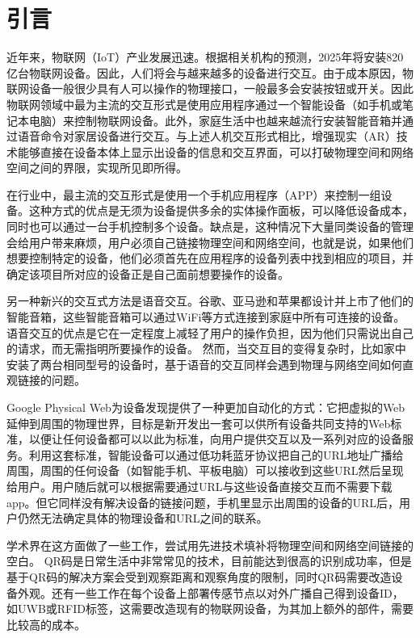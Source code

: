 \def\fr{30}
\def\edg{边缘服务端}
\def\fr{10}
\def\acc{72.7\%}
\def\idenT{93毫秒}
\def\uiT{20秒}

\chapter{引言}
\label{chap:introduction}
近年来，物联网（IoT）产业发展迅速。根据相关机构的预测\cite{macgillivray2019worldwide}，2025年将安装820亿台物联网设备。因此，人们将会与越来越多的设备进行交互。由于成本原因，物联网设备一般很少具有人可以操作的物理接口，一般最多会安装按钮或开关。因此物联网领域中最为主流的交互形式是使用应用程序通过一个智能设备（如手机或笔记本电脑）来控制物联网设备\cite{homeass,xiaomi}。此外，家庭生活中也越来越流行安装智能音箱并通过语音命令对家居设备进行交互\cite{li2019iot,porcheron2018voice}。与上述人机交互形式相比，增强现实（AR）技术能够直接在设备本体上显示出设备的信息和交互界面，可以打破物理空间和网络空间之间的界限，实现所见即所得。

在行业中，最主流的交互形式是使用一个手机应用程序（APP）来控制一组设备。这种方式的优点是无须为设备提供多余的实体操作面板，可以降低设备成本，同时也可以通过一台手机控制多个设备。缺点是，这种情况下大量同类设备的管理会给用户带来麻烦，用户必须自己链接物理空间和网络空间，也就是说，如果他们想要控制特定的设备，他们必须首先在应用程序的设备列表中找到相应的项目，并确定该项目所对应的设备正是自己面前想要操作的设备。

另一种新兴的交互式方法是语音交互。谷歌、亚马逊和苹果都设计并上市了他们的智能音箱\cite{googlehome,AmazonEcho,apple-homepod}，这些智能音箱可以通过WiFi等方式连接到家庭中所有可连接的设备。语音交互的优点是它在一定程度上减轻了用户的操作负担，因为他们只需说出自己的请求，而无需指明所要操作的设备。
然而，当交互目的变得复杂时，比如家中安装了两台相同型号的设备时，基于语音的交互同样会遇到物理与网络空间如何直观链接的问题。

Google Physical Web\cite{jenson2014physical}为设备发现提供了一种更加自动化的方式：它把虚拟的Web延伸到周围的物理世界，目标是新开发出一套可以供所有设备共同支持的Web标准，以便让任何设备都可以以此为标准，向用户提供交互以及一系列对应的设备服务。利用这套标准，智能设备可以通过低功耗蓝牙协议把自己的URL地址广播给周围，周围的任何设备（如智能手机、平板电脑）可以接收到这些URL然后呈现给用户。用户随后就可以根据需要通过URL与这些设备直接交互而不需要下载app。但它同样没有解决设备的链接问题，手机里显示出周围的设备的URL后，用户仍然无法确定具体的物理设备和URL之间的联系。

学术界在这方面做了一些工作，尝试用先进技术填补将物理空间和网络空间链接的空白。
QR码是日常生活中非常常见的技术，目前能达到很高的识别成功率，但是基于QR码的解决方案会受到观察距离和观察角度的限制，同时QR码需要改造设备外观。还有一些工作\cite{alanwar2017selecon}在每个设备上部署传感节点以对外广播自己得到设备ID，如UWB或RFID标签，这需要改造现有的物联网设备，为其加上额外的部件，需要比较高的成本。

